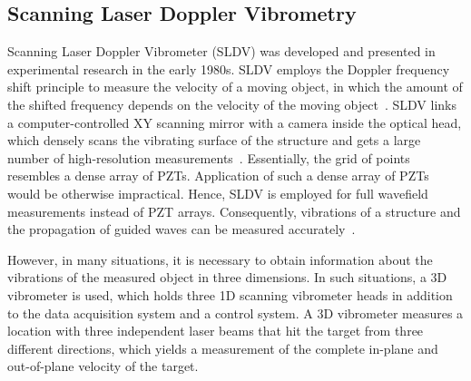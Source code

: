 %
\subsection{Scanning Laser Doppler Vibrometry} 
Scanning Laser Doppler Vibrometer (SLDV) was developed and presented in experimen\-tal research in the early 1980s.
SLDV employs the Doppler frequency shift principle to measure the velocity of a moving object, in which the amount of the shifted frequency depends on the velocity of the moving object~\cite{Stanbridge1999}.
SLDV links a computer-controlled XY scanning mirror with a camera inside the optical head, which densely scans the vibrating surface of the structure and gets a large number of high-resolution measure\-ments~\cite{Helfrick2011}.
Essentially, the grid of points resembles a dense array of PZTs.
Application of such a dense array of PZTs would be otherwise impractical.
Hence, SLDV is employed for full wavefield measurements instead of PZT arrays.
Consequently, vibra\-tions of a structure and the propagation of guided waves can be measured accurately~\cite{Ostachowicz2014}.

However, in many situations, it is necessary to obtain information about the vibrations of the measured object in three dimensions. 
In such situations, a 3D vibrometer is used, which holds three 1D scanning vibrometer heads in addition to the data acquisition system and a control system.
A 3D vibrometer measures a location with three independent laser beams that hit the target from three different directions, which yields a measurement of the complete in-plane and out-of-plane velocity of the target.

